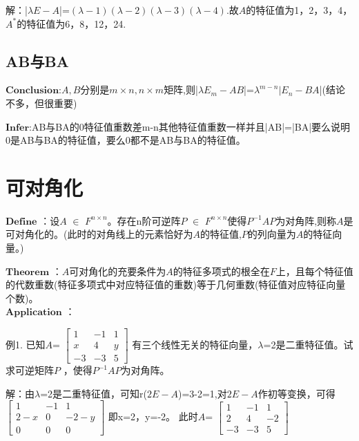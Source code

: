 \documentclass[lang=cn,10pt]{elegantbook}
\begin{document}
解：|$\lambda E-\mathit{A}$|=$(\lambda-1)(\lambda-2)(\lambda-3)(\lambda-4)$.故$\mathit{A}$的特征值为1，2，3，4，$\mathit{A}^{*}$的特征值为6，8，12，24.~\\

\subsection{AB与BA}

$\mathbf{Conclusion}$:$\mathit{A,B}$分别是$m\times n,n\times m$矩阵,则|$\lambda \mathit{E_{m}-AB}$|=$\lambda^{m-n}|\mathit{E_{n}-BA}$|(结论不多，但很重要)

$\mathbf{Infer}$:AB与BA的0特征值重数差m-n其他特征值重数一样并且|AB|=|BA|要么说明0是AB与BA的特征值，要么0都不是AB与BA的特征值。

\section{可对角化}

$\mathbf{Define}$ ：设$\mathit{A}$ $\in$ $\mathit{F^{n\times n} }$。存在n阶可逆阵$\mathit{P}$ $\in$ $\mathit{F^{n\times n} }$使得$\mathit{P^{-1}AP}$为对角阵,则称$\mathit{A}$是可对角化的。(此时的对角线上的元素恰好为$\mathit{A}$的特征值,$\mathit{P}$的列向量为$\mathit{A}$的特征向量。)

$\mathbf{Theorem}$ ：$\mathit{A}$可对角化的充要条件为$\mathit{A}$的特征多项式的根全在$\mathit{F}$上，且每个特征值的代数重数(特征多项式中对应特征值的重数)等于几何重数(特征值对应特征向量个数)。~\\

$\mathbf{Application}$ ：

例1. 已知$\mathit{A}$=
$\begin{bmatrix}
	1& -1 & 1\\
	x& 4 & y\\
	-3 &-3  &5
\end{bmatrix}$
有三个线性无关的特征向量，$\lambda$=2是二重特征值。试求可逆矩阵$\mathit{P}$ ，使得$\mathit{P^{-1}AP}$为对角阵。

解：由$\lambda$=2是二重特征值，可知r($\mathit{2E-A}$)=3-2=1,对$\mathit{2E-A}$作初等变换，可得
$\begin{bmatrix}
	1& -1 & 1\\
	2-x& 0 &-2-y\\
	 0& 0 &0
\end{bmatrix}$
即x=2，y=-2。
此时$\mathit{A}$=
$\begin{bmatrix}
	1& -1 & 1\\
	2& 4 & -2\\
	-3 &-3  &5
\end{bmatrix}$
\end{document}

